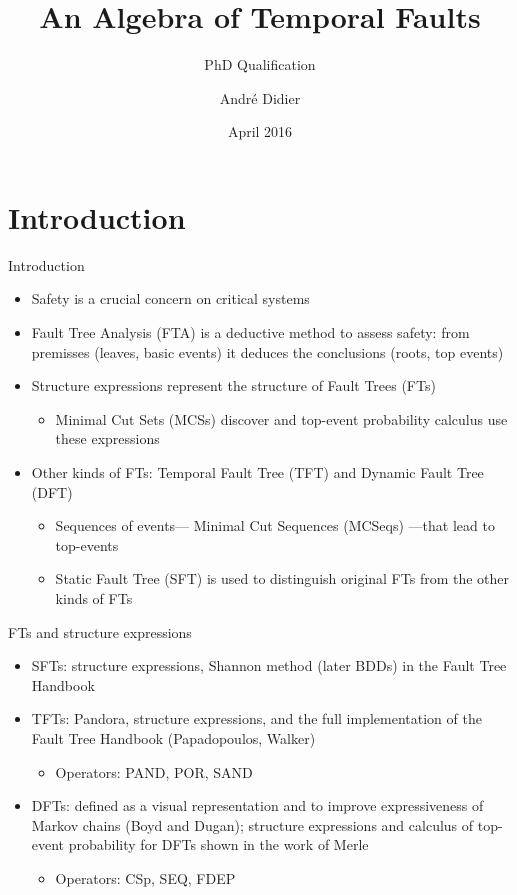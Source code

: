 \documentclass{beamer}
\title{An Algebra of Temporal Faults}
\subtitle{PhD Qualification}
\date{April 2016}
\author{André Didier}
\institute{
\inst{1}Federal University of Pernambuco\\
Centre of Informatics
}
\def\FTA{Fault Tree Analysis (FTA)\gdef\FTA{FTA\xspace}\xspace}
\def\FT{%
	Fault Tree (FT)%
	\gdef\FT{FT\xspace}%
	\gdef\FTs{FTs\xspace}%
	\gdef\IFT{An FT\xspace}%
	\xspace%
}
\def\FTs{%
	Fault Trees (FTs)%
	\gdef\FT{FT\xspace}%
	\gdef\FTs{FTs\xspace}%
	\gdef\IFT{An FT\xspace}%
	\xspace%
}
\def\IFT{%
	A Fault Tree (FT)%
	\gdef\FT{FT\xspace}%
	\gdef\FTs{FTs\xspace}%
	\gdef\IFT{An FT\xspace}%
	\xspace%
}
\def\MCS{%
	Minimal Cut Set (MCS)%
	\gdef\MCS{MCS\xspace}%
	\gdef\MCSs{MCSs\xspace}%
	\xspace%
}
\def\MCSs{%
	Minimal Cut Sets (MCSs)%
	\gdef\MCS{MCS\xspace}%
	\gdef\MCSs{MCSs\xspace}%
	\xspace%
}
\def\MCSeqs{%
	Minimal Cut Sequences (MCSeqs)%
	\gdef\MCS{MCSeq\xspace}%
	\gdef\MCSs{MCSeqs\xspace}%
	\xspace%
}
\def\SFT{%
	Static Fault Tree (SFT)%
	\gdef\SFT{SFT\xspace}%
	\gdef\SFTs{SFTs\xspace}%
	\xspace%
}
\def\SFTs{%
	Static Fault Trees (SFTs)%
	\gdef\SFT{SFT\xspace}%
	\gdef\SFTs{SFTs\xspace}%
	\xspace%
}
\def\TFT{%
	Temporal Fault Tree (TFT)%
	\gdef\TFT{TFT\xspace}%
	\gdef\TFTs{TFTs\xspace}%
	\xspace%
}
\def\TFTs{%
	Temporal Fault Trees (TFTs)%
	\gdef\TFT{TFT\xspace}%
	\gdef\TFTs{TFTs\xspace}%
	\xspace%
}
\def\DFT{%
	Dynamic Fault Tree (DFT)%
	\gdef\DFT{DFT\xspace}%
	\gdef\DFTs{DFTs\xspace}%
	\xspace%
}
\def\DFTs{%
	Dynamic Fault Trees (DFTs)%
	\gdef\DFT{DFT\xspace}%
	\gdef\DFTs{DFTs\xspace}%
	\xspace%
}
\begin{document}
\begin{frame}[label=title]
\titlepage
\end{frame}

\section{Introduction}
\begin{frame}{Introduction}
	\begin{itemize}
		\item Safety is a crucial concern on critical systems
		\item \FTA is a deductive method to assess safety: from premisses (leaves, basic events) it deduces the conclusions (roots, top events)
		\item Structure expressions represent the structure of \FTs
		\begin{itemize}
			\item \MCSs discover and top-event probability calculus use these expressions
		\end{itemize}
		\item Other kinds of \FTs: \TFT and \DFT
		\begin{itemize}
			\item Sequences of events---\MCSeqs---that lead to top-events
			\item \SFT is used to distinguish original \FTs from the other kinds of \FTs
		\end{itemize}
	\end{itemize}
\end{frame}

\begin{frame}{\FTs and structure expressions}
	\begin{itemize}
		\item \SFTs: structure expressions, Shannon method (later BDDs) in the Fault Tree Handbook
		\item \TFTs: Pandora, structure expressions, and the full implementation of the Fault Tree Handbook (Papadopoulos, Walker)
		\begin{itemize}
			\item Operators: PAND, POR, SAND
		\end{itemize}
		\item \DFTs: defined as a visual representation and to improve expressiveness of Markov chains (Boyd and Dugan); structure expressions and calculus of top-event probability for \DFTs shown in the work of Merle
		\begin{itemize}
			\item Operators: CSp, SEQ, FDEP
		\end{itemize}
	\end{itemize}
\end{frame}
\end{document}
